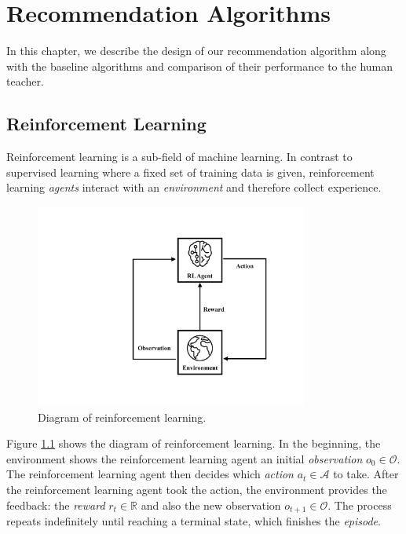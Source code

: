 
\chapter{Recommendation Algorithms}

    In this chapter, we describe the design of our recommendation algorithm
    along with the baseline algorithms and comparison of their performance to the human teacher.

\section{Reinforcement Learning}

    Reinforcement learning is a sub-field of machine learning.
    In contrast to supervised learning where a fixed set of training data is given,
    reinforcement learning \emph{agents} interact with an \emph{environment} and therefore collect experience.

    \begin{figure}[!htp]
        \centering
        \includegraphics[width=0.8\textwidth]{img/rl.pdf}
        \caption{Diagram of reinforcement learning.}
        \label{fig:rl}
    \end{figure}

    Figure \ref{fig:rl} shows the diagram of reinforcement learning.
    In the beginning, the environment shows the reinforcement learning agent
    an initial \emph{observation} $o_0 \in \mathcal{O}$.
    The reinforcement learning agent then decides which \emph{action} $a_t \in \mathcal{A}$ to take.
    After the reinforcement learning agent took the action,
    the environment provides the feedback: the \emph{reward} $r_t \in \mathbb{R}$
    and also the new observation $o_{t+1} \in \mathcal{O}$.
    The process repeats indefinitely until reaching a terminal state,
    which finishes the \emph{episode}.

